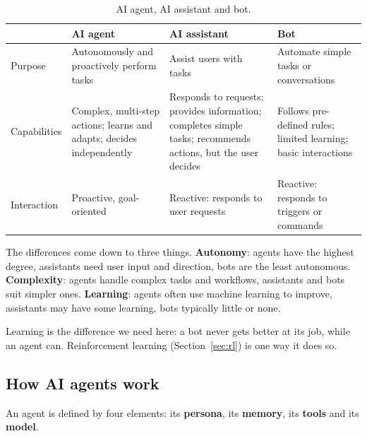 \documentclass[11pt, a4paper]{article}
\begin{document}
\begin{table}[H]
\centering
\small
\caption{AI agent, AI assistant and bot.}
\label{tab:three}
\begin{tabularx}{\textwidth}{l X X X}
\toprule
 & AI agent & AI assistant & Bot \\
\midrule
Purpose & Autonomously and proactively perform tasks & Assist users with tasks & Automate simple tasks or conversations \\
Capabilities & Complex, multi-step actions; learns and adapts; decides independently & Responds to requests; provides information; completes simple tasks; recommends actions, but the user decides & Follows pre-defined rules; limited learning; basic interactions \\
Interaction & Proactive, goal-oriented & Reactive: responds to user requests & Reactive: responds to triggers or commands \\
\bottomrule
\end{tabularx}
\end{table}

The differences come down to three things. \textbf{Autonomy}: agents have the highest degree, assistants need user input and direction, bots are the least autonomous. \textbf{Complexity}: agents handle complex tasks and workflows, assistants and bots suit simpler ones. \textbf{Learning}: agents often use machine learning to improve, assistants may have some learning, bots typically little or none.

Learning is the difference we need here: a bot never gets better at its job, while an agent can. Reinforcement learning (Section~\ref{sec:rl}) is one way it does so.

\subsection{How AI agents work}

An agent is defined by four elements: its \textbf{persona}, its \textbf{memory}, its \textbf{tools} and its \textbf{model}.
\end{document}
